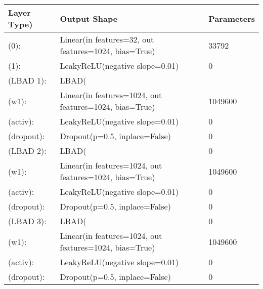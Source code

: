 \begin{center}
    \begin{tabular}{ p{}| p{}| p{}}

        \textbf{Layer Type)} & \textbf{Output Shape}                                  & \textbf{Parameters} \\
        \hline


        (0):                 & Linear(in features=32, out features=1024, bias=True)   & 33792               \\
        (1):                 & LeakyReLU(negative slope=0.01)                         & 0                   \\

        (LBAD 1):            & LBAD(                                                  &                     \\
        (w1):                & Linear(in features=1024, out features=1024, bias=True) & 1049600             \\
        (activ):             & LeakyReLU(negative slope=0.01)                         & 0                   \\
        (dropout):           & Dropout(p=0.5, inplace=False)                          & 0                   \\

        (LBAD 2):            & LBAD(                                                  & 0                   \\
        (w1):                & Linear(in features=1024, out features=1024, bias=True) & 1049600             \\
        (activ):             & LeakyReLU(negative slope=0.01)                         & 0                   \\
        (dropout):           & Dropout(p=0.5, inplace=False)                          & 0                   \\

        (LBAD 3):            & LBAD(                                                  & 0                   \\
        (w1):                & Linear(in features=1024, out features=1024, bias=True) & 1049600             \\
        (activ):             & LeakyReLU(negative slope=0.01)                         & 0                   \\
        (dropout):           & Dropout(p=0.5, inplace=False)                          & 0                   \\


\end{tabular}
\end{center}

